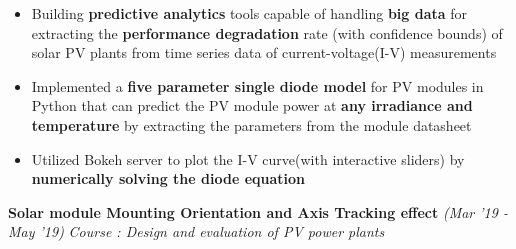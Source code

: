 \documentclass[10 pt]{article}%
\begin{document}
{{{\begin{itemize}[leftmargin=*]
		\item Building \textbf{predictive analytics} tools capable of handling \textbf{big data} for extracting the \textbf{performance degradation} rate (with confidence bounds) of solar PV plants from time series data of current-voltage(I-V) measurements
		\item  Implemented a \textbf{five parameter single diode model} for PV modules in Python that can predict the PV module power at \textbf{any irradiance and temperature} by extracting the parameters from the module datasheet
	\item Utilized Bokeh server to plot the I-V curve(with interactive sliders) by \textbf{numerically solving the diode equation}
\end{itemize}
{\flushleft \textbf {\large{Solar module Mounting Orientation and Axis Tracking effect}} \hfill {{{\em{(Mar '19 - May '19)}}}}
\vspace{-0.8em}
{\flushleft \em{Course : Design and evaluation of PV power plants}}
}}}}
\end{document}
